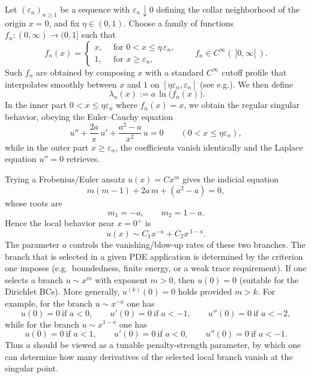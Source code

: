 \documentclass[preprint,12pt]{elsarticle}
\theoremstyle{plain}
\theoremstyle{definition}
\theoremstyle{note}
\begin{document}
Let $(\varepsilon_n)_{n\ge 1}$ be a sequence with $\varepsilon_n \downarrow 0$ defining the collar neighborhood of the origin $x=0$, and fix $\eta\in(0,1)$. Choose a family of functions $f_n:(0,\infty)\to(0,1]$ such that
\begin{equation}\label{eq:A_fn}
f_n(x)=\begin{cases}
x,& \ \ \text{for } 0<x\le \eta\,\varepsilon_n, \\
1,& \ \ \text{for } x\ge \varepsilon_n,
\end{cases}  \qquad
f_n\in C^\infty(~]0,\infty[~).
\end{equation}
Such $f_n$ are obtained by composing $x$ with a standard $C^\infty$ cutoff profile that interpolates smoothly between $x$ and $1$ on $[\eta\varepsilon_n,\varepsilon_n]$ (see e.g.\cite{Hormander1983}). We then define
\begin{equation}\label{eq:A_lambda_def}
\boxed{\ \lambda_n(x) := a\,\ln\!\bigl(f_n(x)\bigr).}
\end{equation}
In the inner part $0<x\le \eta\varepsilon_n$ where $f_n(x)=x$, we obtain the regular singular behavior, obeying the Euler--Cauchy equation
\begin{equation}\label{eq:A_euler}
u''+\frac{2a}{x}\,u' + \frac{a^2-a}{x^2}\,u=0
\qquad (0<x\le \eta\varepsilon_n),
\end{equation}
while in the outer part $x \geq \varepsilon_n$, the coefficients vanish identically and the Laplace equation $u''=0$ retrieves.

Trying a Frobenius/Euler ansatz $u(x)=C x^m$ gives the indicial equation
\[
m(m-1)+2a\,m+(a^2-a)=0,
\]
whose roots are
\[
m_1=-a,
\qquad
m_2=1-a.
\]
Hence the local behavior near $x=0^+$ is
\begin{equation}\label{eq:A_local_sol}
u(x)\sim C_1 x^{-a}+C_2 x^{\,1-a}.
\end{equation}
The parameter $a$ controls the vanishing/blow-up rates of these two branches. The branch that is selected in a given PDE application is determined by the criterion one imposes (e.g.\ boundedness, finite energy, or a weak trace requirement). If one selects a branch $u\sim x^{m}$ with exponent $m>0$, then $u(0)=0$ (suitable for the Dirichlet BCs). More generally, $u^{(k)}(0)=0$ holds provided $m>k$. For example, for the branch $u\sim x^{-a}$ one has
\[
u(0)=0 \ \text{if } a<0,\qquad
u'(0)=0 \ \text{if } a<-1,\qquad
u''(0)=0 \ \text{if } a<-2,
\]
while for the branch $u\sim x^{1-a}$ one has
\[
u(0)=0 \ \text{if } a<1,\qquad
u'(0)=0 \ \text{if } a<0,\qquad
u''(0)=0 \ \text{if } a<-1.
\]
Thus $a$ should be viewed as a tunable penalty-strength parameter, by which one can determine how many derivatives of the selected local branch vanish at the singular point.\\
\end{document}
